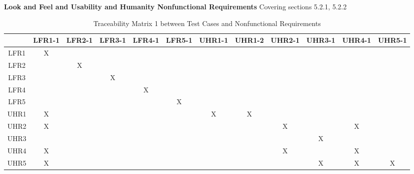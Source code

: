 \documentclass[12pt, titlepage]{article}
\begin{document}
\noindent \textbf{Look and Feel and Usability and Humanity Nonfunctional Requirements}
Covering sections 5.2.1, 5.2.2
\begin{table}[H]
    \tiny
    \centering
    \begin{tabular}{|c|c|c|c|c|c|c|c|c|c|c|c|}
        \hline
        &    LFR1-1&LFR2-1&LFR3-1&LFR4-1&LFR5-1&UHR1-1&UHR1-2&UHR2-1&UHR3-1&UHR4-1&UHR5-1\\ \hline
        LFR1&     X&      &      &      &      &      &      &      &      &      &      \\ \hline
        LFR2&      &     X&      &      &      &      &      &      &      &      &      \\ \hline
        LFR3&      &      &     X&      &      &      &      &      &      &      &      \\ \hline
        LFR4&      &      &      &     X&      &      &      &      &      &      &      \\ \hline
        LFR5&      &      &      &      &     X&      &      &      &      &      &      \\ \hline
        UHR1&     X&      &      &      &      &     X&     X&      &      &      &      \\ \hline
        UHR2&     X&      &      &      &      &      &      &     X&      &     X&      \\ \hline
        UHR3&      &      &      &      &      &      &      &      &     X&      &      \\ \hline
        UHR4&     X&      &      &      &      &      &      &     X&      &     X&      \\ \hline
        UHR5&     X&      &      &      &      &      &      &      &     X&     X&     X\\ \hline
    \end{tabular}
    \caption{Traceability Matrix 1 between Test Cases and Nonfunctional Requirements}
\end{table}
\end{document}
